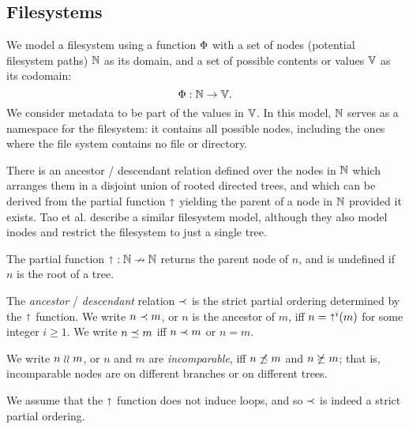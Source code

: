 
\subsection{Filesystems}

\begin{mydef}[Filesystems, $\FS$]
We model a filesystem
using a function $\FS$ with a set of nodes (potential filesystem paths) $\mathbb{N}$ as its domain,
and a set of possible contents or values $\mathbb{V}$ as its codomain:
\[ \Phi: \mathbb{N} \rightarrow \mathbb{V}. \]
We consider metadata to be part of the values in $\mathbb{V}$.
In this model, $\mathbb{N}$ 
serves as a namespace for the filesystem:
it contains all possible nodes, including the ones 
where the file system contains no file or directory.
\end{mydef}


There is an ancestor / descendant relation defined over the nodes in $\mathbb{N}$
which arranges them in a disjoint union of rooted directed trees,
and which can be derived from the partial function $\mathord{\shortuparrow}$ yielding
the parent of a node in $\mathbb{N}$ provided it exists.
Tao et al. \cite{TSR} describe a similar filesystem model, although
they also model inodes and restrict the filesystem to just a single tree.

\begin{mydef}
The partial function $\mathord{\shortuparrow}:\mathbb{N}\nrightarrow\mathbb{N}$
returns the parent node of $n$,
and is undefined if $n$ is the root of a tree.

The \emph{ancestor} / \emph{descendant} relation $\prec$ is the
strict partial ordering determined by the $\mathord{\shortuparrow}$ function.
We write $n\prec m$, or $n$ is the ancestor of $m$,
iff $n=\mathord{\shortuparrow}^i(m)$ for some integer $i\ge 1$.
We write $n\preceq m$ iff $n\prec m$ or $n=m$.

We write $n\mathrel{\wr\wr} m$, or $n$ and $m$ are \emph{incomparable},
iff $n\not\preceq m$ and $n\not\succeq m$;
that is, incomparable nodes are on different branches or on different trees.
\end{mydef}

We assume that the $\mathord{\shortuparrow}$ function does not induce loops, and so
$\prec$ is indeed a strict partial ordering.


